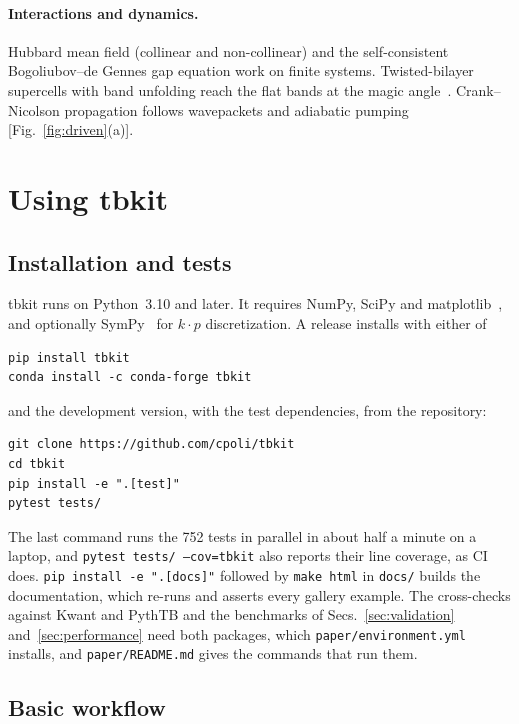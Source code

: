 \documentclass[submission, Phys]{SciPost}
\newcommand{\code}[1]{\texttt{#1}}
\begin{document}
\paragraph{Interactions and dynamics.} Hubbard mean field (collinear and
non-collinear) and the self-consistent Bogoliubov--de Gennes gap equation
work on finite systems. Twisted-bilayer supercells with band unfolding
reach the flat bands at the magic angle~\cite{bistritzer2011}.
Crank--Nicolson propagation follows wavepackets and adiabatic pumping
[Fig.~\ref{fig:driven}(a)].

\section{Using tbkit}
\label{sec:usage}

\subsection{Installation and tests}

tbkit runs on Python~3.10 and later. It requires NumPy, SciPy and
matplotlib~\cite{matplotlib}, and optionally SymPy~\cite{sympy} for
$k\cdot p$ discretization. A release installs with either of
\begin{verbatim}
pip install tbkit
conda install -c conda-forge tbkit
\end{verbatim}
and the development version, with the test dependencies, from the
repository:
\begin{verbatim}
git clone https://github.com/cpoli/tbkit
cd tbkit
pip install -e ".[test]"
pytest tests/
\end{verbatim}
The last command runs the 752 tests in parallel in about half a minute on
a laptop, and \code{pytest tests/ --cov=tbkit} also reports their line
coverage, as CI does. \code{pip install -e ".[docs]"} followed by
\code{make html} in \code{docs/} builds the documentation, which re-runs
and asserts every gallery example. The cross-checks against Kwant and
PythTB and the benchmarks of Secs.~\ref{sec:validation}
and~\ref{sec:performance} need both packages, which
\code{paper/environment.yml} installs, and \code{paper/README.md} gives
the commands that run them.

\subsection{Basic workflow}
\end{document}
